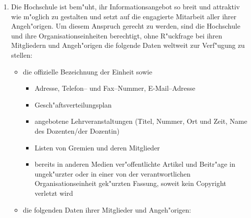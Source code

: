 \begin{enumerate}
  \item Die Hochschule ist bem"uht, ihr Informationsangebot so breit
        und attraktiv wie m"oglich zu gestalten und setzt auf die
        engagierte Mitarbeit aller ihrer Angeh"origen. Um diesem
        Anspruch gerecht zu werden, sind die Hochschule und ihre
        Organisationseinheiten berechtigt, ohne R"uckfrage bei
        ihren Mitgliedern und Angeh"origen die folgende Daten
        weltweit zur Verf"ugung zu stellen:
        \begin{itemize}
          \item die offizielle Bezeichnung der Einheit sowie
                \begin{itemize}
                  \item Adresse, Telefon-- und Fax--Nummer, E-Mail--Adresse
                  \item Gesch"aftsverteilungsplan
                  \item angebotene Lehrveranstaltungen (Titel, Nummer,
                        Ort und Zeit, Name des Dozenten/der Dozentin)
                  \item Listen von Gremien und deren Mitglieder
                  \item bereits in anderen Medien ver"offentlichte
                        Artikel und Beitr"age in ungek"urzter
                        oder in einer von der verantwortlichen
                        Organisationseinheit gek"urzten Fassung,
                        soweit kein Copyright verletzt wird
                \end{itemize}
          \item die folgenden Daten ihrer Mitglieder und Angeh"origen:
        \end{itemize}


\end{enumerate}
